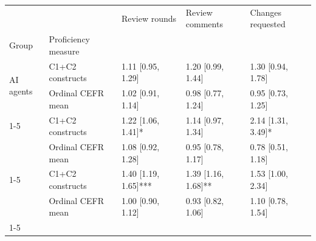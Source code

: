 \begin{tabular}{lllll}
\toprule
 &  & Review rounds & Review comments & Changes requested \\
Group & Proficiency measure &  &  &  \\
\midrule
\multirow[t]{2}{*}{AI agents} & C1+C2 constructs & 1.11 [0.95, 1.29] & 1.20 [0.99, 1.44] & 1.30 [0.94, 1.78] \\
 & Ordinal CEFR mean & 1.02 [0.91, 1.14] & 0.98 [0.77, 1.24] & 0.95 [0.73, 1.25] \\
\cline{1-5}
\multirow[t]{2}{*}{Human} & C1+C2 constructs & 1.22 [1.06, 1.41]* & 1.14 [0.97, 1.34] & 2.14 [1.31, 3.49]* \\
 & Ordinal CEFR mean & 1.08 [0.92, 1.28] & 0.95 [0.78, 1.17] & 0.78 [0.51, 1.18] \\
\cline{1-5}
\multirow[t]{2}{*}{Human (pre-ChatGPT)} & C1+C2 constructs & 1.40 [1.19, 1.65]*** & 1.39 [1.16, 1.68]** & 1.53 [1.00, 2.34] \\
 & Ordinal CEFR mean & 1.00 [0.90, 1.12] & 0.93 [0.82, 1.06] & 1.10 [0.78, 1.54] \\
\cline{1-5}
\bottomrule
\end{tabular}
